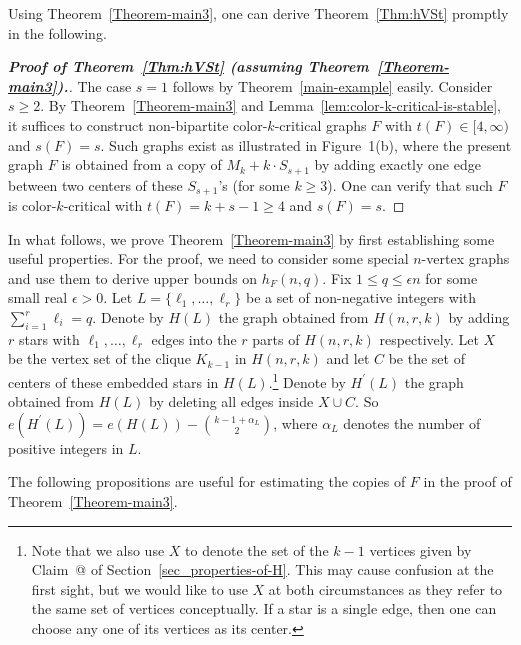 \documentclass[10pt]{article}
\makeatletter
\newcommand*{\rom}[1]{\expandafter\@slowromancap\romannumeral #1@}
\makeatother
\begin{document}
Using Theorem~\ref{Theorem-main3}, one can derive Theorem~\ref{Thm:hVSt} promptly in the following.

\begin{proof}[\bf Proof of Theorem~\ref{Thm:hVSt} (assuming Theorem~\ref{Theorem-main3}).]
The case $s=1$ follows by Theorem~\ref{main-example} easily.
Consider $s\geq 2$.
By Theorem~\ref{Theorem-main3} and Lemma~\ref{lem:color-k-critical-is-stable}, it suffices to construct non-bipartite color-$k$-critical graphs $F$ with $t(F)\in [4,\infty)$ and $s(F)=s$.
Such graphs exist as illustrated in Figure~1(b),
where the present graph $F$ is obtained from a copy of $M_k+k\cdot S_{s+1}$ by adding exactly one edge between two centers of these $S_{s+1}$'s (for some $k\geq 3$).
One can verify that such $F$ is color-$k$-critical with $t(F)=k+s-1\geq 4$ and $s(F)=s$.
\end{proof}


In what follows, we prove Theorem~\ref{Theorem-main3} by first establishing some useful properties.
For the proof, we need to consider some special $n$-vertex graphs and use them to derive upper bounds on $h_F(n,q)$.
Fix $1\leq q\leq \epsilon n$ for some small real $\epsilon>0$. Let $L=\{\ell_1, \ldots ,\ell_r\}$ be a set of non-negative integers with $\sum_{i=1}^{r}\ell_i=q$.
Denote by $H(L)$ the graph obtained from $H(n,r,k)$ by adding $r$ stars with $\ell_1,\ldots,\ell_r$ edges into the $r$ parts of $H(n,r,k)$ respectively.
Let $X$ be the vertex set of the clique $K_{k-1}$ in $H(n,r,k)$ and let $C$ be the set of centers of these embedded stars in $H(L)$.\footnote{Note that we also use $X$ to denote the set of the $k-1$ vertices given by Claim~\rom{1} of Section~\ref{sec_properties-of-H}. This may cause confusion at the first sight, but we would like to use $X$ at both circumstances as they refer to the same set of vertices conceptually. If a star is a single edge, then one can choose any one of its vertices as its center.}
Denote by $H^\prime(L)$ the graph obtained from $H(L)$ by deleting all edges inside $X\cup C$.
So $e(H^\prime(L))=e(H(L))-{k-1+\alpha_L \choose 2}$, where $\alpha_L$ denotes the number of positive integers in $L$.

The following propositions are useful for estimating the copies of $F$ in the proof of Theorem~\ref{Theorem-main3}.
\end{document}
